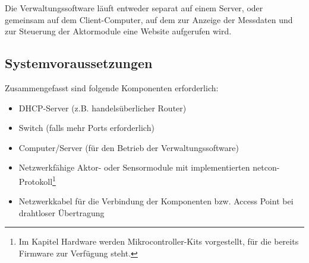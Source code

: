 \documentclass[a4paper,14pt,headsepline]{scrartcl}
\begin{document}
\begin{figure}[h]
\begin{center}
\end{center}
\end{figure}

Die Verwaltungssoftware läuft entweder separat auf einem Server, oder gemeinsam auf dem Client-Computer, auf dem zur Anzeige der Messdaten und zur Steuerung der Aktormodule eine Website aufgerufen wird. 

\newpage

\subsection{Systemvoraussetzungen}

Zusammengefasst sind folgende Komponenten erforderlich:

\begin{itemize}

\item DHCP-Server (z.B. handelsüberlicher Router)
\item Switch (falls mehr Ports erforderlich)
\item Computer/Server (für den Betrieb der Verwaltungssoftware)
\item Netzwerkfähige Aktor- oder Sensormodule mit implementierten netcon-Protokoll\footnote{Im Kapitel Hardware werden Mikrocontroller-Kits vorgestellt, für die bereits Firmware zur Verfügung steht.} 
\item Netzwerkkabel für die Verbindung der Komponenten bzw. Access Point bei drahtloser Übertragung

\end{itemize}
\end{document}
